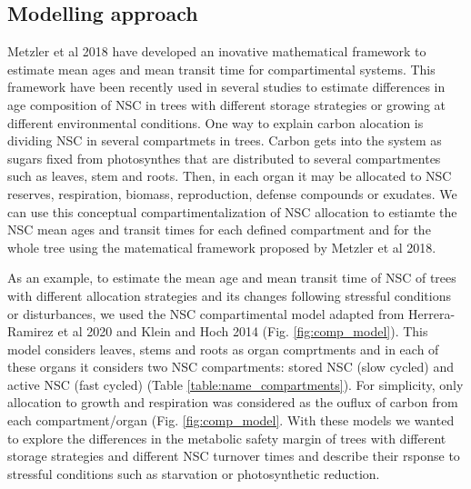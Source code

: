 \documentclass{article}
\begin{document}
\subsection {Modelling approach}

Metzler et al 2018 have developed an inovative mathematical framework to estimate mean ages and mean transit time for compartimental systems.
This framework have been recently used in several studies to estimate differences in age composition of NSC in trees with different storage strategies or growing at different environmental conditions. 
One way to explain carbon alocation is dividing NSC in several compartmets in trees.
Carbon gets into the system as sugars fixed from photosynthes that are distributed to several compartmentes such as leaves, stem and roots.
Then, in each organ it may be allocated to NSC reserves, respiration, biomass, reproduction, defense compounds or exudates.
We can use this conceptual compartimentalization of NSC allocation to estiamte the NSC mean ages and transit times  for each defined compartment and for the whole tree using the matematical framework proposed by Metzler et al 2018. 

As an example, to estimate the mean age and mean transit time of NSC of trees with different allocation strategies and its changes following stressful conditions or disturbances, we used the NSC compartimental model adapted from Herrera-Ramirez et al 2020 and Klein and Hoch 2014 (Fig. \ref{fig:comp_model}). 
This model considers leaves, stems and roots as organ comprtments and in each of these organs it considers two NSC compartments: stored NSC (slow cycled) and active NSC (fast cycled) (Table \ref{table:name_compartments}).
For simplicity, only allocation to growth and respiration was considered as the ouflux of carbon from each compartment/organ (Fig. \ref{fig:comp_model}.
With these models we wanted to explore the differences in the metabolic safety margin of trees with different storage strategies and different NSC turnover times and describe their rsponse to stressful conditions such as starvation or photosynthetic reduction. 
\end{document}
